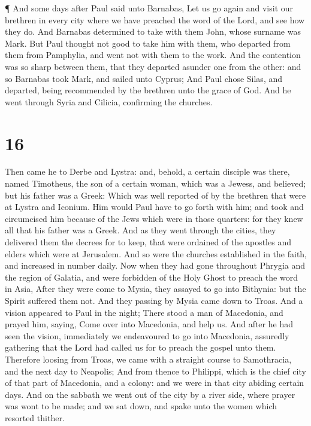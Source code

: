 ¶ And some days after Paul said unto Barnabas, Let us go
again and visit our brethren in every city where we have preached the
word of the Lord, and see how they do.  And Barnabas
determined to take with them John, whose surname was Mark. 
But Paul thought not good to take him with them, who departed from them
from Pamphylia, and went not with them to the work.  And
the contention was so sharp between them, that they departed asunder one
from the other: and so Barnabas took Mark, and sailed unto Cyprus;
 And Paul chose Silas, and departed, being recommended by
the brethren unto the grace of God.  And he went through
Syria and Cilicia, confirming the churches.

\hypertarget{section-15}{%
\section{16}\label{section-15}}

 Then came he to Derbe and Lystra: and, behold, a certain
disciple was there, named Timotheus, the son of a certain woman, which
was a Jewess, and believed; but his father was a Greek: 
Which was well reported of by the brethren that were at Lystra and
Iconium.  Him would Paul have to go forth with him; and took
and circumcised him because of the Jews which were in those quarters:
for they knew all that his father was a Greek.  And as they
went through the cities, they delivered them the decrees for to keep,
that were ordained of the apostles and elders which were at Jerusalem.
 And so were the churches established in the faith, and
increased in number daily.  Now when they had gone
throughout Phrygia and the region of Galatia, and were forbidden of the
Holy Ghost to preach the word in Asia,  After they were come
to Mysia, they assayed to go into Bithynia: but the Spirit suffered them
not.  And they passing by Mysia came down to Troas.
 And a vision appeared to Paul in the night; There stood a
man of Macedonia, and prayed him, saying, Come over into Macedonia, and
help us.  And after he had seen the vision, immediately we
endeavoured to go into Macedonia, assuredly gathering that the Lord had
called us for to preach the gospel unto them.  Therefore
loosing from Troas, we came with a straight course to Samothracia, and
the next day to Neapolis;  And from thence to Philippi,
which is the chief city of that part of Macedonia, and a colony: and we
were in that city abiding certain days.  And on the sabbath
we went out of the city by a river side, where prayer was wont to be
made; and we sat down, and spake unto the women which resorted thither.

